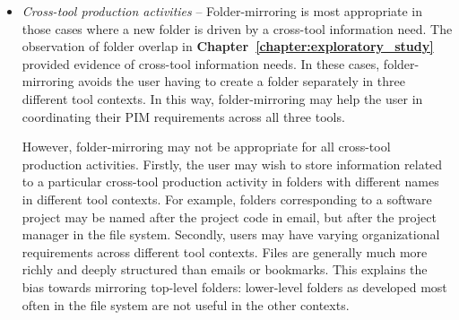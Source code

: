 \begin{itemize}
\item \textit{Cross-tool production activities} -- Folder-mirroring is most appropriate in those cases where a new folder is driven by a cross-tool information need.  The observation of folder overlap in \textbf{Chapter~\ref{chapter:exploratory_study}} provided evidence of cross-tool information needs.  In these cases, folder-mirroring avoids the user having to create a folder separately in three different tool contexts.  In this way, folder-mirroring may help the user in coordinating their PIM requirements across all three tools.

However, folder-mirroring may not be appropriate for all cross-tool production activities.
Firstly, the user may wish to store information related to a particular cross-tool production activity in folders with different names in different tool contexts.  For example, folders corresponding to a software project may be named after the project code in email, but after the project manager in the file system. %
Secondly, users may have varying organizational requirements across different tool contexts.  Files are generally much more richly and deeply structured than emails or bookmarks.  This explains the bias towards mirroring top-level folders: lower-level folders as developed most often in the file system are not useful in the other contexts.


\end{itemize}
